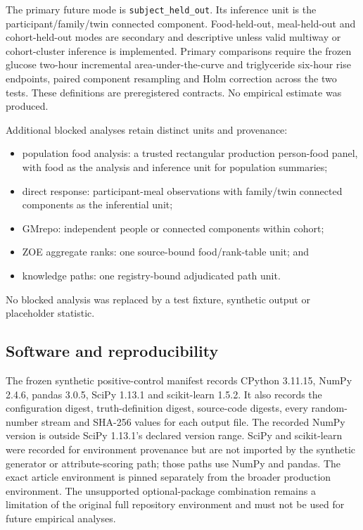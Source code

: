 The primary future mode is \texttt{subject\_held\_out}. Its inference unit is the
participant/family/twin connected component. Food-held-out, meal-held-out and
cohort-held-out modes are secondary and descriptive unless valid multiway or
cohort-cluster inference is implemented. Primary comparisons require the frozen
glucose two-hour incremental area-under-the-curve and triglyceride six-hour rise
endpoints, paired component resampling and Holm correction across the two tests.
These definitions are preregistered contracts. No empirical estimate was produced.

Additional blocked analyses retain distinct units and provenance:
\begin{itemize}
\item population food analysis: a trusted rectangular production person-food
panel, with food as the analysis and inference unit for population summaries;
\item direct response: participant-meal observations with family/twin connected
components as the inferential unit;
\item GMrepo: independent people or connected components within cohort;
\item ZOE aggregate ranks: one source-bound food/rank-table unit; and
\item knowledge paths: one registry-bound adjudicated path unit.
\end{itemize}
No blocked analysis was replaced by a test fixture, synthetic output or
placeholder statistic.

\subsection*{Software and reproducibility}

The frozen synthetic positive-control manifest records CPython 3.11.15, NumPy
2.4.6, pandas 3.0.5, SciPy 1.13.1 and scikit-learn 1.5.2. It also records the
configuration digest, truth-definition digest, source-code digests, every
random-number stream and SHA-256 values for each output file. The recorded
NumPy version is outside SciPy 1.13.1's declared version range. SciPy and
scikit-learn were recorded for environment provenance but are not imported by
the synthetic generator or attribute-scoring path; those paths use NumPy and
pandas. The exact article environment is pinned separately from the broader
production environment. The unsupported optional-package combination remains
a limitation of the original full repository environment and must not be used
for future empirical analyses.
